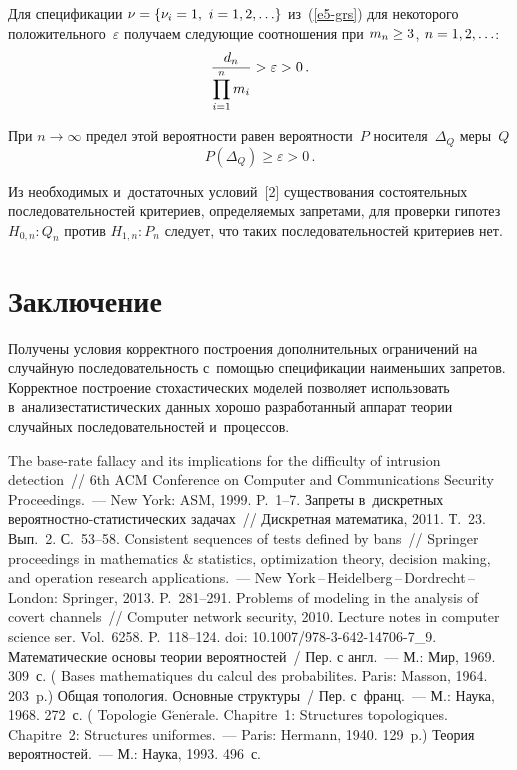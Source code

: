 \begin{multicols}{2}
    Для спецификации $\nu\hm=\{\nu_i\hm=1,\ i\hm= 1,2,\ldots\}$
из~(\ref{e5-grs}) для некоторого положительного~$\varepsilon$ получаем
следующие соотношения при $m_n\hm\geq3$, $n\hm=1, 2,\ldots$:
    $$
    \displaystyle\frac{\displaystyle d_n\mathstrut}{\displaystyle \prod\limits_{i=1}^n m_i\mathstrut}>\varepsilon>0\,.
    $$

    При $n\to\infty$ предел этой вероятности равен вероятности~$P$
носителя~$\Delta_Q$ меры~$Q$
    $$
    P\left( \Delta_Q\right) \geq \varepsilon >0\,.
    $$

  Из необходимых и~достаточных условий~[2] существования состоятельных
последовательностей критериев, определяемых запретами, для проверки
гипотез $H_{0,n}:Q_n$ против $H_{1,n}:P_n$ следует, что таких
последовательностей критериев нет.

\section{Заключение}

Получены условия корректного построения дополни\-тельных
ограничений на случайную последовательность с~помощью спецификации
наименьших запретов. Корректное построение стохастических моделей
позволяет использовать в~анализе\linebreak статистических данных хорошо
разработанный аппарат теории случайных последовательностей и~процессов.

{\small\frenchspacing
 {%
 \begin{thebibliography}{9}
     The base-rate fallacy and its implications for the difficulty of
intrusion detection~// 6th ACM Conference on Computer and Communications
Security Proceedings.~--- New York: ASM, 1999. P.~1--7.
     Запреты в~дискретных
    ве\-ро\-ят\-но\-ст\-но-ста\-ти\-сти\-че\-ских задачах~// Дискретная
математика, 2011. Т.~23. Вып.~2. С.~53--58.
     Consistent sequences of tests defined
by bans~// Springer proceedings in mathematics \& statistics, optimization theory,
decision making, and operation research applications.~---
    New York\,--\,Heidelberg\,--\,Dordrecht\,--\,London: Springer, 2013.
    \mbox{P.~281--291.}
     Problems of modeling in the analysis
of covert channels~// Computer network security, 2010. Lecture notes in computer
science ser. Vol.~6258. P.~118--124. doi: 10.1007/978-3-642-14706-7\_9.
     Математические основы теории вероятностей~/
    Пер. с англ.~--- М.: Мир,
1969. 309~с.
( {Bases mathematiques du calcul des probabilites}.
Paris: Masson, 1964. 203~p.)
     Общая топология. Основные структуры~/ Пер.
     с~франц.~--- М.: Наука, 1968. 272~с. ( Topologie
G$\acute{\mbox{e}}$n$\acute{\mbox{e}}$rale. Chapitre~1: Structures
topologiques. Chapitre~2: Structures uniformes.~--- Paris: Hermann, 1940. 129~p.)
     Теория вероятностей.~--- М.: Наука,
1993. 496~с.




\end{thebibliography}}}
\end{multicols}
